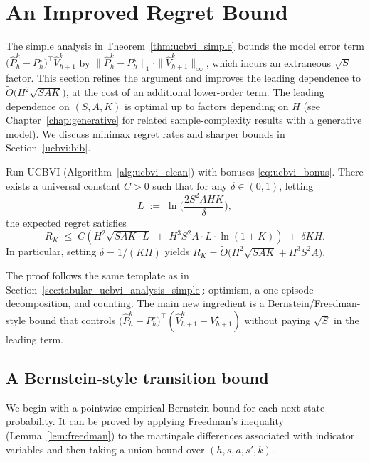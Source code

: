 \section{An Improved Regret Bound}
\label{sec:refined_ucbvi}

The simple analysis in Theorem~\ref{thm:ucbvi_simple} bounds the model error term
$\big(\widehat P_h^k-P_h^\star\big)^\top \widehat V_{h+1}^k$ by
$\|\widehat P_h^k-P_h^\star\|_1\cdot \|\widehat V_{h+1}^k\|_\infty$, which incurs an
extraneous $\sqrt S$ factor. This section refines the argument and improves the leading
dependence to $\widetilde O\!\big(H^2\sqrt{SAK}\big)$, at the cost of an additional lower-order term.
The leading dependence on $(S,A,K)$ is optimal up to factors depending on $H$ (see Chapter~\ref{chap:generative}
for related sample-complexity results with a generative model). We discuss minimax regret rates and
sharper bounds in Section~\ref{ucbvi:bib}.

\begin{theorem}
\label{thm:ucbvi_refined}
Run UCBVI (Algorithm~\ref{alg:ucbvi_clean}) with bonuses \eqref{eq:ucbvi_bonus}.
There exists a universal constant $C>0$ such that for any $\delta\in(0,1)$, letting
\[
L \;:=\; \ln\!\Big(\frac{2S^2AHK}{\delta}\Big),
\]
the expected regret satisfies
\[
R_K
\;\le\;
C\!\left(
H^2\sqrt{SAK\cdot L}
\;+\;
H^3 S^2A\cdot L\cdot \ln(1+K)
\right)
\;+\;
\delta K H.
\]
In particular, setting $\delta=1/(KH)$ yields
$
R_K=\widetilde O\!\big(H^2\sqrt{SAK}+H^3S^2A\big).
$
\end{theorem}

The proof follows the same template as in Section~\ref{sec:tabular_ucbvi_analysis_simple}:
optimism, a one-episode decomposition, and counting. The main new ingredient is a Bernstein/Freedman-style
bound that controls
$\big(\widehat P_h^k-P_h^\star\big)^\top(\widehat V_{h+1}^k-V_{h+1}^\star)$
without paying $\sqrt S$ in the leading term.

\subsection{A Bernstein-style transition bound}

We begin with a pointwise empirical Bernstein bound for each next-state probability. It can be proved by
applying Freedman's inequality (Lemma~\ref{lem:freedman}) to the martingale differences associated with
indicator variables and then taking a union bound over $(h,s,a,s',k)$.

